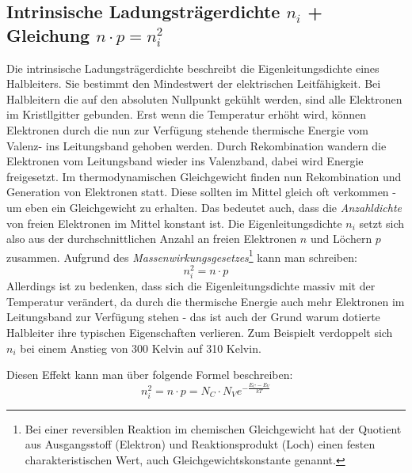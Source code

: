 \documentclass{article}
\begin{document}
	\subsection{Intrinsische Ladungsträgerdichte $n_i$ + Gleichung $n \cdot p=n_i^2$ }
	Die intrinsische Ladungsträgerdichte beschreibt die Eigenleitungsdichte eines Halbleiters. Sie bestimmt den Mindestwert der elektrischen Leitfähigkeit.  
	Bei Halbleitern die auf den absoluten Nullpunkt gekühlt werden, sind alle Elektronen im Kristllgitter gebunden. Erst wenn die Temperatur erhöht wird, können Elektronen durch die nun zur Verfügung stehende thermische Energie vom Valenz- ins Leitungsband gehoben werden.
	Durch Rekombination wandern die Elektronen vom Leitungsband wieder ins Valenzband, dabei wird Energie freigesetzt. 
	Im thermodynamischen Gleichgewicht finden nun Rekombination und Generation von Elektronen statt. Diese sollten im Mittel gleich oft verkommen - um eben ein Gleichgewicht zu erhalten.
	Das bedeutet auch, dass die \textit{Anzahldichte} von freien Elektronen im Mittel konstant ist. 
	Die Eigenleitungsdichte $n_i$ setzt sich also aus der durchschnittlichen Anzahl an freien Elektronen $n$ und Löchern $p$ zusammen. Aufgrund des \textit{Massenwirkungsgesetzes}\footnote{Bei einer reversiblen Reaktion im chemischen Gleichgewicht hat der Quotient aus Ausgangsstoff (Elektron) und Reaktionsprodukt (Loch) einen festen charakteristischen Wert, auch Gleichgewichtskonstante genannt.} kann man schreiben:
	\begin{equation}
	    n_i^2 = n \cdot p
	\end{equation}
	Allerdings ist zu bedenken, dass sich die Eigenleitungsdichte massiv mit der Temperatur verändert, da durch die thermische Energie auch mehr Elektronen im Leitungsband zur Verfügung stehen - das ist auch der Grund warum dotierte Halbleiter ihre typischen Eigenschaften verlieren.
	Zum Beispielt verdoppelt sich $n_i$ bei einem Anstieg von 300 Kelvin auf 310 Kelvin.
	
	Diesen Effekt kann man über folgende Formel beschreiben:
	\begin{equation}
	    n_i^2 = n \cdot p = N_C \cdot N_V e^{-\frac{E_C-E_V}{kT}}
	\end{equation}\label{equ:eigenleitung}
	
\end{document}
